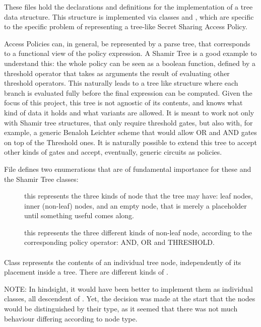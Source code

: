 \documentclass{article}
\begin{document}
These files hold the declarations and definitions for the implementation of a tree data structure. This structure is implemented via classes \cnode and \ctree, which are specific to the specific problem of representing a tree-like Secret Sharing Access Policy.

Access Policies can, in general, be represented by a parse tree, that corresponds to a functional view of the policy expression. A Shamir Tree is a good example to understand this: the whole policy can be seen as a boolean function, defined by a threshold operator that takes as arguments the result of evaluating other threshold operators. This naturally leads to a tree like structure where each branch is evaluated fully before the final expression can be computed. Given the focus of this project, this tree is not agnostic of its contents, and knows what kind of data it holds and what variants are allowed. It is meant to work not only with Shamir tree structures, that only require threshold gates, but also with, for example, a generic Benaloh Leichter scheme that would allow OR and AND gates on top of the Threshold ones. It is naturally possible to extend this tree to accept other kinds of gates and accept, eventually, generic circuits as policies.

File \fhtree defines two enumerations that are of fundamental importance for these and the Shamir Tree classes:
\begin{description}
\item[] this represents the three kinds of node that the tree may have: leaf nodes, inner (non-leaf) nodes, and an empty node, that is merely a placeholder until something useful comes along.
\item[] this represents the three different kinds of non-leaf node, according to the corresponding policy operator: AND, OR and THRESHOLD.
\end{description}

\paragraph{\cnode}
Class \cnode represents the contents of an individual tree node, independently of its placement inside a tree. There are different kinds of \cnode.

NOTE:  In hindsight, it would have been better to implement them as individual classes, all descendent of \cnode. Yet, the decision was made at the start that the nodes would be distinguished by their type, as it seemed that there was not much behaviour differing according to node type.
\end{document}

